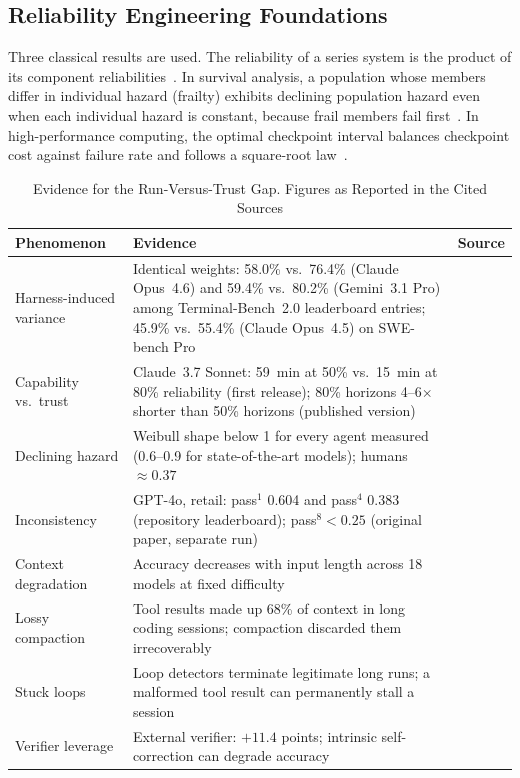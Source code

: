 \documentclass[journal]{IEEEtran}
\begin{document}
\subsection{Reliability Engineering Foundations}
Three classical results are used. The reliability of a series system is the product of its component reliabilities~\cite{oconnor2012}. In survival analysis, a population whose members differ in individual hazard (frailty) exhibits declining population hazard even when each individual hazard is constant, because frail members fail first~\cite{vaupel1979}. In high-performance computing, the optimal checkpoint interval balances checkpoint cost against failure rate and follows a square-root law~\cite{young1974,daly2006}.

\begin{table}[!t]
\centering
\caption{Evidence for the Run-Versus-Trust Gap. Figures as Reported in the Cited Sources}
\label{tab:evidence}
\small
\begin{tabularx}{\textwidth}{@{}p{3.3cm}Xp{2.2cm}@{}}
\toprule
Phenomenon & Evidence & Source\\
\midrule
Harness-induced variance & Identical weights: 58.0\% vs.\ 76.4\% (Claude Opus~4.6) and 59.4\% vs.\ 80.2\% (Gemini~3.1 Pro) among Terminal-Bench~2.0 leaderboard entries; 45.9\% vs.\ 55.4\% (Claude Opus~4.5) on SWE-bench Pro & \cite{guo2026survey,zhang2026disclose}\\
Capability vs.\ trust & Claude~3.7 Sonnet: 59~min at 50\% vs.\ 15~min at 80\% reliability (first release); 80\% horizons 4--6$\times$ shorter than 50\% horizons (published version) & \cite{kwa2025v1,kwa2025}\\
Declining hazard & Weibull shape below 1 for every agent measured (0.6--0.9 for state-of-the-art models); humans $\approx0.37$ & \cite{hamilton2026,ord2026}\\
Inconsistency & GPT-4o, retail: pass$^1$ 0.604 and pass$^4$ 0.383 (repository leaderboard); pass$^8<0.25$ (original paper, separate run) & \cite{taubenchlb,yao2024}\\
Context degradation & Accuracy decreases with input length across 18 models at fixed difficulty & \cite{hong2025,liu2024}\\
Lossy compaction & Tool results made up 68\% of context in long coding sessions; compaction discarded them irrecoverably & \cite{faafo2026}\\
Stuck loops & Loop detectors terminate legitimate long runs; a malformed tool result can permanently stall a session & \cite{openhands5355,openhands5225}\\
Verifier leverage & External verifier: $+11.4$ points; intrinsic self-correction can degrade accuracy & \cite{pan2025,huang2024}\\
\bottomrule
\end{tabularx}
\end{table}
\end{document}
